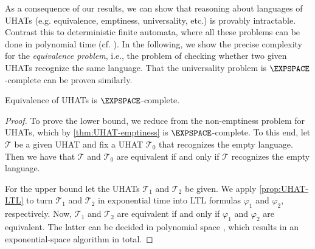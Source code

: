 %

As a consequence of our results, we can show that reasoning about languages of UHATs (e.g.
equivalence, emptiness, universality, etc.) is provably intractable. 
Contrast this to deterministic finite automata, where all these problems can be done in
polynomial time (cf. \citep{Kozen}). In the following,
we show the precise complexity for the \emph{equivalence problem}, 
i.e., the problem of checking whether two given UHATs recognize the same 
language.
That the universality problem is $\EXPSPACE$-complete can be proven similarly.

\begin{theorem}
Equivalence of UHATs is $\EXPSPACE$-complete.
\end{theorem}
\begin{proof}
To prove the lower bound, we reduce from the non-emptiness problem for UHATs, 
which by \cref{thm:UHAT-emptiness} is $\EXPSPACE$-complete.
To this end, let $\mathcal{T}$ be a given UHAT and fix a UHAT $\mathcal{T}_0$ that recognizes the empty language. 
Then we have that $\mathcal{T}$ and $\mathcal{T}_0$ are equivalent if and only if $\mathcal{T}$ recognizes the empty language.

For the upper bound let the UHATs $\mathcal{T}_1$ and $\mathcal{T}_2$ be given.
We apply \cref{prop:UHAT-LTL} to turn $\mathcal{T}_1$ and $\mathcal{T}_2$ in exponential time
into LTL formulas $\varphi_1$ and $\varphi_2$, respectively.
Now, $\mathcal{T}_1$ and $\mathcal{T}_2$ are equivalent if and only if $\varphi_1$ and $\varphi_2$ are equivalent.
The latter can be decided in polynomial space \citep{SistlaC85}, which results in an exponential-space algorithm in total.
\end{proof}